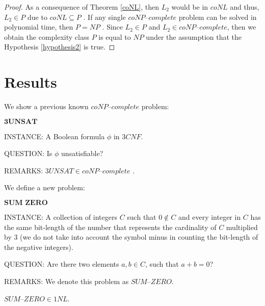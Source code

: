 \documentclass[a4paper,UKenglish,cleveref, autoref]{lipics-v2019}
\begin{document}
\begin{proof}
As a consequence of Theorem \ref{coNL}, then $L_{2}$ would be in $coNL$ and thus, $L_{2} \in P$ due to $coNL \subseteq P$ \cite{Pap03}. If any single $\textit{coNP--complete}$ problem can be solved in polynomial time, then $P = NP$ \cite{Pap03}. Since $L_{2} \in P$ and $L_{2} \in \textit{coNP--complete}$, then we obtain the complexity class $P$ is equal to $NP$ under the assumption that the Hypothesis \ref{hypothesis2} is true.
\end{proof}

\section{Results}

We show a previous known $\textit{coNP--complete}$ problem:

\begin{definition}
$\textbf{3UNSAT}$

INSTANCE: A Boolean formula $\phi$ in $3CNF$.

QUESTION: Is $\phi$ unsatisfiable?

REMARKS: $3UNSAT \in \textit{coNP--complete}$ \cite{GJ79}.
\end{definition}

We define a new problem:

\begin{definition}
$\textbf{SUM ZERO}$

INSTANCE: A collection of integers $C$ such that $0 \notin C$ and every integer in $C$ has the same bit-length of the number that represents the cardinality of $C$ multiplied by $3$ (we do not take into account the symbol minus in counting the bit-length of the negative integers).

QUESTION: Are there two elements $a, b \in C$, such that $a + b = 0$?

REMARKS: We denote this problem as $\textit{SUM--ZERO}$.
\end{definition}


\begin{theorem}
\label{1nl}
$\textit{SUM--ZERO} \in 1NL$.
\end{theorem}
\end{document}
